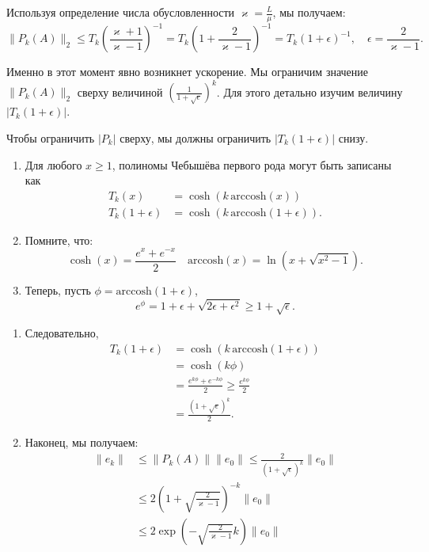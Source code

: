 \documentclass[
  russian,
  letterpaper,
  DIV=11,
  numbers=noendperiod]{scrartcl}
\begin{document}
Используя определение числа обусловленности
\(\varkappa = \frac{L}{\mu}\), мы получаем: \[
\|P_k(A)\|_2 \le T_k\left(\frac{\varkappa+1}{\varkappa-1}\right)^{-1} = T_k\left(1 + \frac{2}{\varkappa-1}\right)^{-1} = T_k\left(1 + \epsilon\right)^{-1}, \quad \epsilon = \frac{2}{\varkappa-1}.
\]

Именно в этот момент явно возникнет ускорение. Мы ограничим значение
\(\|P_k(A)\|_2\) сверху величиной
\(\left(\frac{1}{1 + \sqrt{\epsilon}}\right)^k\). Для этого детально
изучим величину \(|T_k(1 + \epsilon)|\).

Чтобы ограничить \(|P_k|\) сверху, мы должны ограничить
\(|T_k(1 + \epsilon)|\) снизу.

\begin{enumerate}
\def\labelenumi{\arabic{enumi}.}
\item
  Для любого \(x\ge 1\), полиномы Чебышёва первого рода могут быть
  записаны как \[
  \begin{aligned}
  T_k(x)&=\cosh\left(k\,\mathrm{arccosh}(x)\right)\\
  T_k(1+\epsilon)&=\cosh\left(k\,\mathrm{arccosh}(1+\epsilon)\right).
  \end{aligned}
  \]
\item
  Помните, что: \[
   \cosh(x)=\frac{e^x+e^{-x}}{2} \quad \mathrm{arccosh}(x) = \ln(x + \sqrt{x^2-1}).
   \]
\item
  Теперь, пусть \(\phi=\mathrm{arccosh}(1+\epsilon)\), \[
   e^{\phi}=1+\epsilon + \sqrt{2\epsilon+\epsilon^2} \geq 1+\sqrt{\epsilon}.
   \]
\end{enumerate}

\begin{enumerate}
\def\labelenumi{\arabic{enumi}.}
\setcounter{enumi}{3}
\item
  Следовательно, \[
   \begin{aligned}
   T_k(1+\epsilon)&=\cosh\left(k\,\mathrm{arccosh}(1+\epsilon)\right) \\
   &= \cosh\left(k\phi\right) \\
   &= \frac{e^{k\phi} + e^{-k\phi}}{2} \geq\frac{e^{k\phi}}{2} \\
   &= \frac{\left(1+\sqrt{\epsilon}\right)^k}{2}.
   \end{aligned}
   \]
\item
  Наконец, мы получаем: \[
   \begin{aligned}
   \|e_k\| &\leq \|P_k(A)\| \|e_0\| \leq \frac{2}{\left(1 + \sqrt{\epsilon}\right)^k} \|e_0\| \\ 
   &\leq 2 \left(1 + \sqrt{\frac{2}{\varkappa-1}}\right)^{-k} \|e_0\| \\
   &\leq 2 \exp\left( - \sqrt{\frac{2}{\varkappa-1}} k\right) \|e_0\|
   \end{aligned}
   \]
\end{enumerate}
\end{document}
